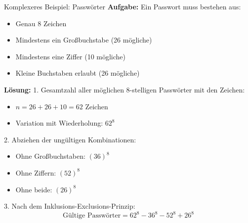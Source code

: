 \begin{example2}{Komplexeres Beispiel: Passwörter}
\textbf{Aufgabe:} Ein Passwort muss bestehen aus:
\begin{itemize}
\item Genau 8 Zeichen
\item Mindestens ein Großbuchstabe (26 mögliche)
\item Mindestens eine Ziffer (10 mögliche)
\item Kleine Buchstaben erlaubt (26 mögliche)
\end{itemize}

\textbf{Lösung:}
1. Gesamtzahl aller möglichen 8-stelligen Passwörter mit den Zeichen:
   \begin{itemize}
   \item $n = 26 + 26 + 10 = 62$ Zeichen
   \item Variation mit Wiederholung: $62^8$
   \end{itemize}

2. Abziehen der ungültigen Kombinationen:
   \begin{itemize}
   \item Ohne Großbuchstaben: $(36)^8$
   \item Ohne Ziffern: $(52)^8$
   \item Ohne beide: $(26)^8$
   \end{itemize}

3. Nach dem Inklusions-Exclusions-Prinzip:
   \[ \text{Gültige Passwörter} = 62^8 - 36^8 - 52^8 + 26^8 \]
\end{example2}